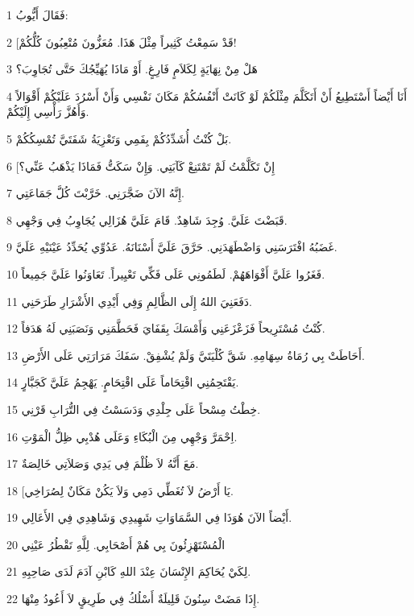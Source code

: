 \par 1 فَقَالَ أَيُّوبُ:
\par 2 [قَدْ سَمِعْتُ كَثِيراً مِثْلَ هَذَا. مُعَزُّونَ مُتْعِبُونَ كُلُّكُمْ!
\par 3 هَلْ مِنْ نِهَايَةٍ لِكَلاَمٍ فَارِغٍ. أَوْ مَاذَا يُهَيِّجُكَ حَتَّى تُجَاوِبَ؟
\par 4 أَنَا أَيْضاً أَسْتَطِيعُ أَنْ أَتَكَلَّمَ مِثْلَكُمْ لَوْ كَانَتْ أَنْفُسُكُمْ مَكَانَ نَفْسِي وَأَنْ أَسْرُدَ عَلَيْكُمْ أَقْوَالاً وَأَهُزَّ رَأْسِي إِلَيْكُمْ.
\par 5 بَلْ كُنْتُ أُشَدِّدُكُمْ بِفَمِي وَتَعْزِيَةُ شَفَتَيَّ تُمْسِكُكُمْ.
\par 6 [إِنْ تَكَلَّمْتُ لَمْ تَمْتَنِعْ كَآبَتِي. وَإِنْ سَكَتُّ فَمَاذَا يَذْهَبُ عَنِّي؟
\par 7 إِنَّهُ الآنَ ضَجَّرَنِي. خَرَّبْتَ كُلَّ جَمَاعَتِي.
\par 8 قَبَضْتَ عَلَيَّ. وُجِدَ شَاهِدٌ. قَامَ عَلَيَّ هُزَالِي يُجَاوِبُ فِي وَجْهِي.
\par 9 غَضَبُهُ افْتَرَسَنِي وَاضْطَهَدَنِي. حَرَّقَ عَلَيَّ أَسْنَانَهُ. عَدُوِّي يُحَدِّدُ عَيْنَيْهِ عَلَيَّ.
\par 10 فَغَرُوا عَلَيَّ أَفْوَاهَهُمْ. لَطَمُونِي عَلَى فَكِّي تَعْيِيراً. تَعَاوَنُوا عَلَيَّ جَمِيعاً.
\par 11 دَفَعَنِيَ اللهُ إِلَى الظَّالِمِ وَفِي أَيْدِي الأَشْرَارِ طَرَحَنِي.
\par 12 كُنْتُ مُسْتَرِيحاً فَزَعْزَعَنِي وَأَمْسَكَ بِقَفَايَ فَحَطَّمَنِي وَنَصَبَنِي لَهُ هَدَفاً.
\par 13 أَحَاطَتْ بِي رُمَاةُ سِهَامِهِ. شَقَّ كُلْيَتَيَّ وَلَمْ يُشْفِقْ. سَفَكَ مَرَارَتِي عَلَى الأَرْضِ.
\par 14 يَقْتَحِمُنِي اقْتِحَاماً عَلَى اقْتِحَامٍ. يَهْجِمُ عَلَيَّ كَجَبَّارٍ.
\par 15 خِطْتُ مِسْحاً عَلَى جِلْدِي وَدَسَسْتُ فِي التُّرَابِ قَرْنِي.
\par 16 اِحْمَرَّ وَجْهِي مِنَ الْبُكَاءِ وَعَلَى هُدْبِي ظِلُّ الْمَوْتِ.
\par 17 مَعَ أَنَّهُ لاَ ظُلْمَ فِي يَدِي وَصَلاَتِي خَالِصَةٌ.
\par 18 [يَا أَرْضُ لاَ تُغَطِّي دَمِي وَلاَ يَكُنْ مَكَانٌ لِصُرَاخِي.
\par 19 أَيْضاً الآنَ هُوَذَا فِي السَّمَاوَاتِ شَهِيدِي وَشَاهِدِي فِي الأَعَالِي.
\par 20 الْمُسْتَهْزِئُونَ بِي هُمْ أَصْحَابِي. لِلَّهِ تَقْطُرُ عَيْنِي
\par 21 لِكَيْ يُحَاكِمَ الإِنْسَانَ عِنْدَ اللهِ كَابْنِ آدَمَ لَدَى صَاحِبِهِ.
\par 22 إِذَا مَضَتْ سِنُونَ قَلِيلَةٌ أَسْلُكُ فِي طَرِيقٍ لاَ أَعُودُ مِنْهَا.

